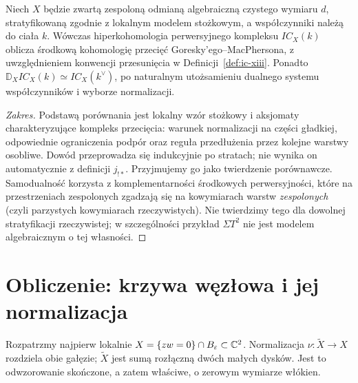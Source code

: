 \begin{twierdzenie}
\label{thm:ic-comparison-xiii}
Niech $X$ będzie zwartą zespoloną odmianą
algebraiczną czystego wymiaru $d$,
stratyfikowaną zgodnie z lokalnym modelem stożkowym,
a współczynniki należą do ciała $k$.
Wówczas hiperkohomologia perwersyjnego kompleksu
$IC_X(k)$ oblicza środkową kohomologię przecięć
Goresky'ego--MacPhersona, z uwzględnieniem
konwencji przesunięcia w Definicji~\ref{def:ic-xiii}.
Ponadto $\mathbb D_XIC_X(k)\simeq IC_X(k^\vee)$,
po naturalnym utożsamieniu dualnego systemu
współczynników i wyborze normalizacji.
\end{twierdzenie}
\begin{proof}[Zakres]
Podstawą porównania jest lokalny wzór stożkowy
i aksjomaty charakteryzujące kompleks przecięcia:
warunek normalizacji na części gładkiej,
odpowiednie ograniczenia podpór oraz reguła
przedłużenia przez kolejne warstwy osobliwe.
Dowód przeprowadza się indukcyjnie po stratach;
nie wynika on automatycznie z definicji $j_{!*}$.
Przyjmujemy go jako twierdzenie porównawcze.
Samodualność korzysta z komplementarności
środkowych perwersyjności, które na przestrzeniach
zespolonych zgadzają się na kowymiarach warstw
\emph{zespolonych} (czyli parzystych kowymiarach
rzeczywistych). Nie twierdzimy tego dla dowolnej
stratyfikacji rzeczywistej; w szczególności
przykład $\Sigma T^2$ nie jest modelem
algebraicznym o tej własności.
\end{proof}

\section{Obliczenie: krzywa węzłowa i jej normalizacja}
\label{sec:nodal-perverse-xiii}
Rozpatrzmy najpierw lokalnie
$X=\{zw=0\}\cap B_\varepsilon\subset\mathbb{C}^2$.
Normalizacja $\nu:\widetilde X\to X$ rozdziela
obie gałęzie; $\widetilde X$ jest sumą rozłączną
dwóch małych dysków. Jest to odwzorowanie skończone,
a zatem właściwe, o zerowym wymiarze włókien.

